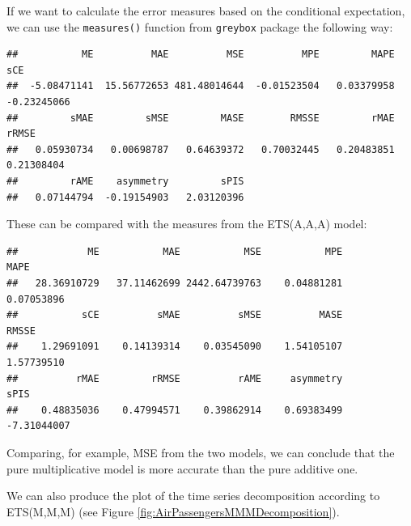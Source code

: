 \documentclass[
]{book}
\newenvironment{Shaded}{\begin{snugshade}}{\end{snugshade}}
\newcommand{\FunctionTok}[1]{\textcolor[rgb]{0.00,0.00,0.00}{#1}}
\newcommand{\NormalTok}[1]{#1}
\newcommand{\SpecialCharTok}[1]{\textcolor[rgb]{0.00,0.00,0.00}{#1}}
\theoremstyle{definition}
\theoremstyle{definition}
\theoremstyle{definition}
\theoremstyle{definition}
\theoremstyle{remark}
\begin{document}
If we want to calculate the error measures based on the conditional expectation, we can use the \texttt{measures()} function from \texttt{greybox} package the following way:

\begin{Shaded}
\end{Shaded}

\begin{verbatim}
##           ME          MAE          MSE          MPE         MAPE          sCE 
##  -5.08471141  15.56772653 481.48014644  -0.01523504   0.03379958  -0.23245066 
##         sMAE         sMSE         MASE        RMSSE         rMAE        rRMSE 
##   0.05930734   0.00698787   0.64639372   0.70032445   0.20483851   0.21308404 
##         rAME    asymmetry         sPIS 
##   0.07144794  -0.19154903   2.03120396
\end{verbatim}

These can be compared with the measures from the ETS(A,A,A) model:

\begin{Shaded}
\end{Shaded}

\begin{verbatim}
##            ME           MAE           MSE           MPE          MAPE 
##   28.36910729   37.11462699 2442.64739763    0.04881281    0.07053896 
##           sCE          sMAE          sMSE          MASE         RMSSE 
##    1.29691091    0.14139314    0.03545090    1.54105107    1.57739510 
##          rMAE         rRMSE          rAME     asymmetry          sPIS 
##    0.48835036    0.47994571    0.39862914    0.69383499   -7.31044007
\end{verbatim}

Comparing, for example, MSE from the two models, we can conclude that the pure multiplicative model is more accurate than the pure additive one.

We can also produce the plot of the time series decomposition according to ETS(M,M,M) (see Figure \ref{fig:AirPassengersMMMDecomposition}).
\end{document}
